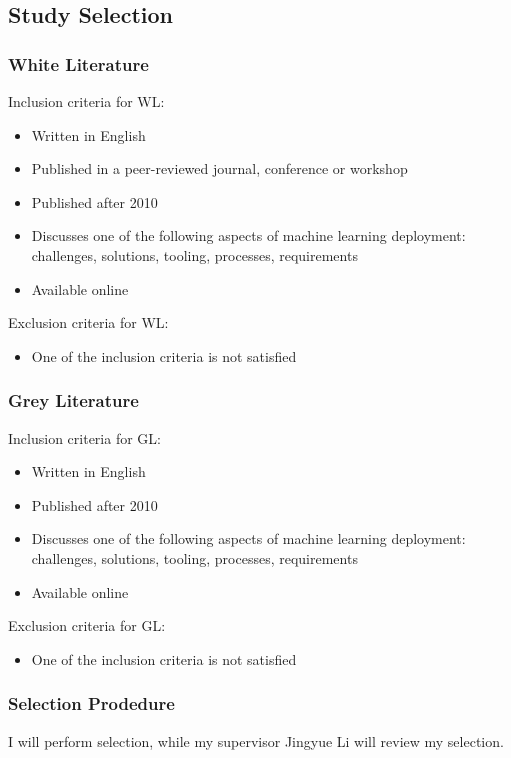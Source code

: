 \subsection{Study Selection}
\subsubsection{White Literature}
\label{subsubsec:white_literature_selection_criteria}
Inclusion criteria for WL:
\begin{itemize}
    \item Written in English
    \item Published in a peer-reviewed journal, conference or workshop
    \item Published after 2010
    \item Discusses one of the following aspects of machine learning deployment: challenges, solutions, tooling, processes, requirements
    \item Available online
\end{itemize}
Exclusion criteria for WL:
\begin{itemize}
    \item One of the inclusion criteria is not satisfied
\end{itemize}

\subsubsection{Grey Literature}
Inclusion criteria for GL:
\begin{itemize}
    \item Written in English
    \item Published after 2010
    \item Discusses one of the following aspects of machine learning deployment: challenges, solutions, tooling, processes, requirements
    \item Available online
\end{itemize}
Exclusion criteria for GL:
\begin{itemize}
    \item One of the inclusion criteria is not satisfied
\end{itemize}

\subsubsection{Selection Prodedure}
I will perform selection, while my supervisor Jingyue Li will review my selection.

